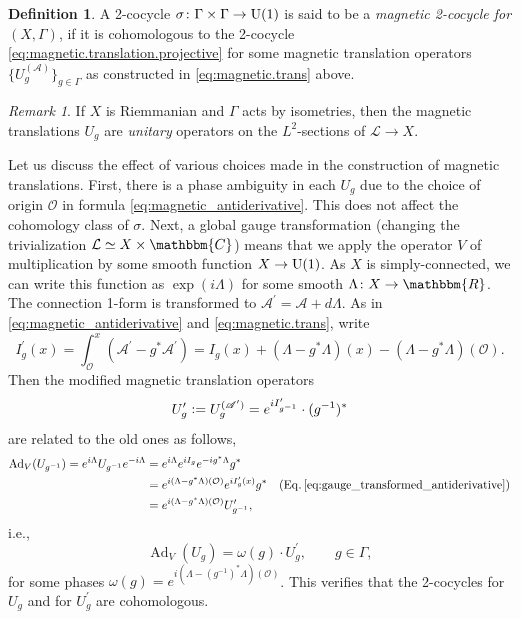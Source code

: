 \documentclass{amsart}
\numberwithin{figure}{section}
\numberwithin{equation}{section}
\numberwithin{table}{section}
\theoremstyle{plain}
\theoremstyle{definition}
\newtheorem{definition}[equation]{Definition}
\theoremstyle{remark}
\newtheorem{remark}[equation]{Remark}
\theoremstyle{nonumber}
\newcommand{\C}{\mathbb{C}}
\newcommand{\Ad}{\operatorname{Ad}} %
\newcommand{\defeq}{\mathrel{\vcentcolon=}}
\renewcommand{\mathbb}{\mathbbm} %
\begin{document}
\begin{definition}\label{dfn:magnetic.2.cocycle}
A 2-cocycle $\sigma\colon \Gamma\times\Gamma\to{\rm U}(1)$ is said to be a \emph{magnetic 2-cocycle for $(X,\Gamma)$}, if it is cohomologous to the 2-cocycle \eqref{eq:magnetic.translation.projective} for some magnetic translation operators $\{U^{(\mathscr{A})}_g\}_{g\in\Gamma}$ as constructed in \eqref{eq:magnetic.trans} above.
\end{definition}
\begin{remark}
If $X$ is Riemmanian and $\Gamma$ acts by isometries, then the magnetic translations $U_g$ are \emph{unitary} operators on the $L^2$-sections of $\mathcal{L}\to X$.
\end{remark}

Let us discuss the effect of various choices made in the construction of
magnetic translations. First, there is a phase ambiguity in each $U_g$ due
to the choice of origin $\mathcal{O}$ in formula
\eqref{eq:magnetic_antiderivative}. This does not affect the cohomology
class of $\sigma$.  Next, a global gauge transformation (changing the
trivialization $\mathcal{L}\simeq X\times \C$) means that we apply the
operator $V$ of multiplication by some smooth function $X\to {\rm U}(1)$.
As $X$ is simply-connected, we can write this function as $\exp(i\Lambda)$
for some smooth $\Lambda\colon X\to\mathbb{R}$. The connection 1-form is
transformed to $\mathscr{A}^\prime=\mathscr{A}+d\Lambda$. As in
\eqref{eq:magnetic_antiderivative} and \eqref{eq:magnetic.trans},
write 
\begin{equation}\label{eq:gauge_transformed_antiderivative}
I^\prime_g(x)=\int_\mathcal{O}^x(\mathscr{A}^\prime-g^*\mathscr{A}^\prime)=I_g(x)+(\Lambda-g^*\Lambda)(x)-(\Lambda-g^*\Lambda)(\mathcal{O}).
\end{equation}
Then the modified magnetic translation operators
\[
U_g^\prime\defeq 
U_g^{(\mathscr{A}^\prime)}=e^{iI^\prime_{g^{-1}}}\cdot (g^{-1})^*
\]
are related to the old ones as follows,
\begin{align*}
    \Ad_V(U_{g^{-1}})=e^{i\Lambda}U_{g^{-1}}e^{-i\Lambda}
    &=e^{i\Lambda}e^{iI_g}e^{-ig^*\Lambda}g^*\\
    &=e^{i(\Lambda-g^*\Lambda)(\mathcal{O})}e^{iI_g^\prime(x)}g^* & (\mathrm{Eq.}\,\eqref{eq:gauge_transformed_antiderivative})\\
    &=e^{i(\Lambda-g^*\Lambda)(\mathcal{O})}U^\prime_{g^{-1}},
\end{align*}
i.e.,
\[
\Ad_V(U_g)=\omega(g)\cdot U^\prime_{g},\qquad g\in \Gamma,
\]
for some phases $\omega(g)=e^{i(\Lambda-(g^{-1})^*\Lambda)(\mathcal{O})}$. This verifies that the 2-cocycles for $U_g$ and for $U_g^\prime$ are cohomologous.
\end{document}

